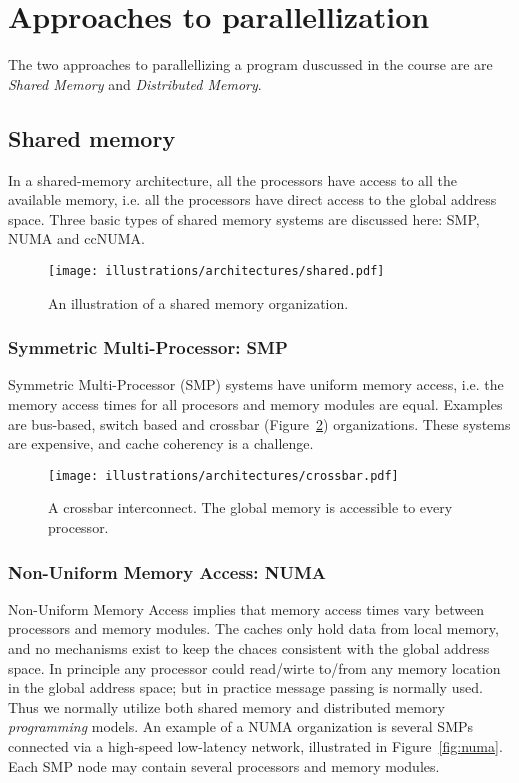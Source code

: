 
\section{Approaches to parallellization} %
\label{sec:approaches_to_parallellization}

The two approaches to parallellizing a program duscussed in the course are are \emph{Shared Memory} and \emph{Distributed Memory}.

\subsection{Shared memory} %
\label{sub:shared_memory}
In a shared-memory architecture, all the processors have access to all the available memory, i.e. all the processors have direct access to the global address space. Three basic types of shared memory systems are discussed here: SMP, NUMA and ccNUMA.

\begin{figure}[htbp]
  \centering
  \texttt{[image: illustrations/architectures/shared.pdf]}
  \caption{An illustration of a shared memory organization.}
  \label{fig:shared}
\end{figure}

\subsubsection{Symmetric Multi-Processor: SMP} %
\label{ssub:uniform_memory_access}
Symmetric Multi-Processor (SMP) systems have uniform memory access, i.e. the memory access times for all procesors and memory modules are equal. Examples are bus-based, switch based and crossbar (Figure~\ref{fig:crossbar_a}) organizations. These systems are expensive, and cache coherency is a challenge.

\begin{figure}[htbp]
  \centering
  \texttt{[image: illustrations/architectures/crossbar.pdf]}
  \caption{A crossbar interconnect. The global memory is accessible to every processor.}
  \label{fig:crossbar_a}
\end{figure}

\subsubsection{Non-Uniform Memory Access: NUMA} %
\label{ssub:non_uniform_memory_access_numa}
 Non-Uniform Memory Access implies that memory access times vary between processors and memory modules. The caches only hold data from local memory, and no mechanisms exist to keep the chaces consistent with the global address space. In principle any processor could read/wirte to/from any memory location in the global address space; but in practice message passing is normally used. Thus we normally utilize both shared memory and distributed memory \emph{programming} models. An example of a NUMA organization is several SMPs connected via a high-speed low-latency network, illustrated in Figure~\ref{fig:numa}. Each SMP node may contain several processors and memory modules.

